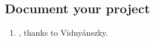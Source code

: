 \subsection{Document your project}
\begin{enumerate}
\item {}, thanks to Vidnyánszky.
\end{enumerate}

